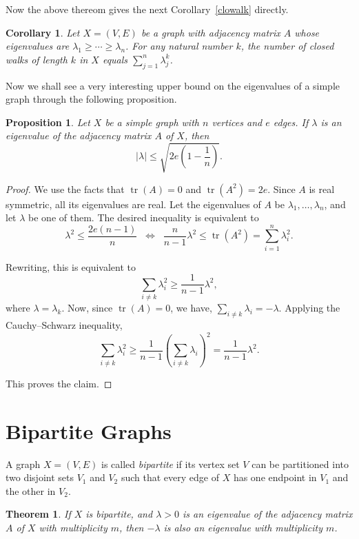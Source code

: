 \documentclass{amsart}
\theoremstyle{plain}
\newtheorem{theorem}{Theorem}[section]
\newtheorem{corollary}{Corollary}[section]
\newtheorem{proposition}{Proposition}[section]
\begin{document}
Now the above thereom gives the next Corollary~\ref{clowalk} directly.

\begin{corollary}
Let $X = (V, E)$ be a graph with adjacency matrix $A$ whose eigenvalues are 
$\lambda_1 \ge \cdots \ge \lambda_n$. For any natural number $k$, the number 
of closed walks of length $k$ in $X$ equals $\sum_{j=1}^{n} \lambda_j^k$.
\end{corollary}

Now we shall see a very interesting upper bound on the eigenvalues of a simple graph through the following proposition.


\begin{proposition}
Let $X$ be a simple graph with $n$ vertices and $e$ edges. If $\lambda$ 
is an eigenvalue of the adjacency matrix $A$ of $X$, then
\[
|\lambda| \le \sqrt{2e\left(1-\frac{1}{n}\right)}.
\]
\end{proposition}

\begin{proof}
We use the facts that $\operatorname{tr}(A) = 0$ and $\operatorname{tr}(A^2) = 2e$. 
Since $A$ is real symmetric, all its eigenvalues are real. Let the eigenvalues of $A$ be $\lambda_1, \dots, \lambda_n$, and let $\lambda$ 
be one of them. The desired inequality is equivalent to
\[
\lambda^2 \le \frac{2e(n-1)}{n}
\;\;\Longleftrightarrow\;\;
\frac{n}{n-1}\lambda^2 \le \operatorname{tr}(A^2)
= \sum_{i=1}^n \lambda_i^2.
\]

Rewriting, this is equivalent to
\[
\sum_{i \ne k} \lambda_i^2 \ge \frac{1}{n-1}\lambda^2,
\]
where $\lambda = \lambda_k$. Now, since $\operatorname{tr}(A) = 0$, we have, $\sum_{i \ne k} \lambda_i = -\lambda$. Applying the Cauchy--Schwarz inequality,
\[
\sum_{i \ne k} \lambda_i^2 
\ge \frac{1}{n-1} \left( \sum_{i \ne k} \lambda_i \right)^2
= \frac{1}{n-1}\lambda^2.
\]

This proves the claim.
\end{proof}




\section{Bipartite Graphs}

A graph $X = (V, E)$ is called \emph{bipartite} if its vertex set $V$ can be partitioned 
into two disjoint sets $V_1$ and $V_2$ such that every edge of $X$ has one endpoint in 
$V_1$ and the other in $V_2$.

\begin{theorem}\label{bip_mul}
If $X$ is bipartite, and $\lambda > 0$ is an eigenvalue of the adjacency matrix $A$ 
of $X$ with multiplicity $m$, then $-\lambda$ is also an eigenvalue with multiplicity $m$.
\end{theorem}
\end{document}

